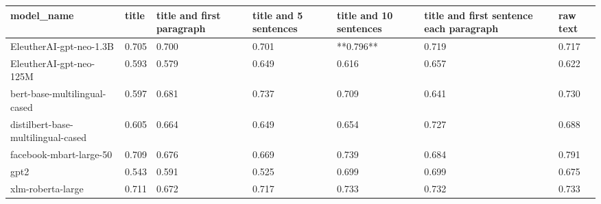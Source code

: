 \begin{tabular}{lllllll}
\toprule
                        model\_name & title & title and first paragraph & title and 5 sentences & title and 10 sentences & title and first sentence each paragraph & raw text \\
\midrule
           EleutherAI-gpt-neo-1.3B & 0.705 &                     0.700 &                 0.701 &              **0.796** &                                   0.719 &    0.717 \\
           EleutherAI-gpt-neo-125M & 0.593 &                     0.579 &                 0.649 &                  0.616 &                                   0.657 &    0.622 \\
      bert-base-multilingual-cased & 0.597 &                     0.681 &                 0.737 &                  0.709 &                                   0.641 &    0.730 \\
distilbert-base-multilingual-cased & 0.605 &                     0.664 &                 0.649 &                  0.654 &                                   0.727 &    0.688 \\
           facebook-mbart-large-50 & 0.709 &                     0.676 &                 0.669 &                  0.739 &                                   0.684 &    0.791 \\
                              gpt2 & 0.543 &                     0.591 &                 0.525 &                  0.699 &                                   0.699 &    0.675 \\
                 xlm-roberta-large & 0.711 &                     0.672 &                 0.717 &                  0.733 &                                   0.732 &    0.733 \\
\bottomrule
\end{tabular}

